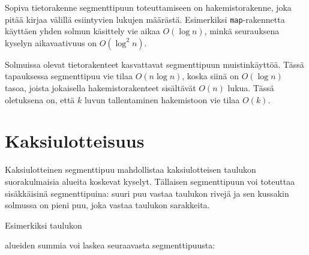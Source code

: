 Sopiva tietorakenne segmenttipuun toteuttamiseen on
hakemistorakenne, joka pitää kirjaa välillä esiintyvien
lukujen määrästä.
Esimerkiksi \texttt{map}-ra\-ken\-net\-ta käyttäen
yhden solmun käsittely vie aikaa $O(\log n)$,
minkä seurauksena kyselyn aikavaativuus on $O(\log^2 n)$.

Solmuissa olevat tietorakenteet kasvattavat
segmenttipuun muistinkäyttöä.
Tässä tapauksessa
segmenttipuu vie tilaa $O(n \log n)$,
koska siinä on $O(\log n)$ tasoa, joista
jokaisella hakemistorakenteet sisältävät $O(n)$ lukua.
Tässä oletuksena on, että $k$ luvun tallentaminen
hakemistoon vie tilaa $O(k)$.

\section{Kaksiulotteisuus}

Kaksiulotteinen segmenttipuu mahdollistaa
kaksiulotteisen taulukon
suorakulmaisia alueita koskevat kyselyt.
Tällaisen segmenttipuun voi toteuttaa
sisäkkäisinä segmenttipuina:
suuri puu vastaa taulukon rivejä
ja sen kussakin solmussa on pieni puu,
joka vastaa taulukon sarakkeita.

Esimerkiksi taulukon
\begin{center}
\end{center}

alueiden summia voi laskea seuraavasta segmenttipuusta:

